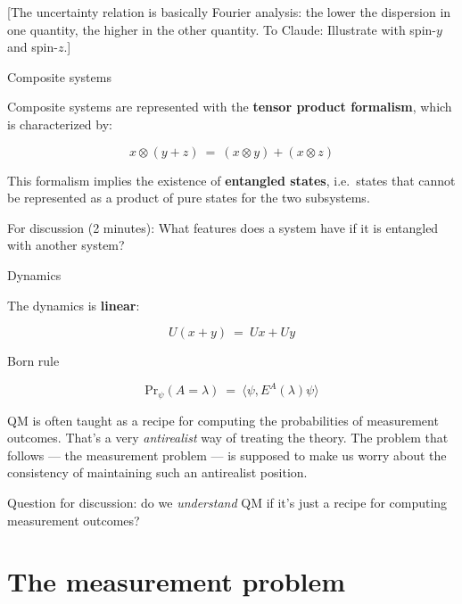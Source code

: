 \begin{frame}
  
[The uncertainty relation is basically Fourier analysis: the lower the
dispersion in one quantity, the higher in the other quantity. To
Claude: Illustrate with spin-$y$ and spin-$z$.]

\end{frame}

\begin{frame}{Composite systems}

  Composite systems are represented with the \textbf{tensor product
    formalism}, which is characterized by:

  \[ x\otimes (y+z) \: = \: (x\otimes y)+(x\otimes z) \]

  This formalism implies the existence of \textbf{entangled states},
  i.e.\ states that cannot be represented as a product of pure states
  for the two subsystems.

  For discussion (2 minutes): What features does a system have if it
  is entangled with another system?
  

\end{frame}  

\begin{frame}{Dynamics}

  The dynamics is \textbf{linear}:

  \[ U(x+y) \: = \: Ux + Uy \]

\end{frame}


\begin{frame}{Born rule}

  \[ \mathrm{Pr}_{\psi }(A=\lambda ) \: = \: \langle \psi ,E^A(\lambda
  )\psi \rangle  \]



\end{frame}



  QM is often taught as a recipe for computing the probabilities of
  measurement outcomes. That's a very \emph{antirealist} way of
  treating the theory. The problem that follows --- the measurement
  problem --- is supposed to make us worry about the consistency of
  maintaining such an antirealist position.

  Question for discussion: do we \emph{understand} QM if it's just a
  recipe for computing measurement outcomes?

\section{The measurement problem}

